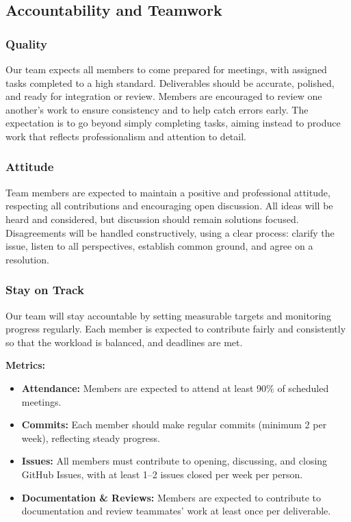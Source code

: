 \documentclass{article}
\begin{document}
\subsection*{Accountability and Teamwork}

\subsubsection*{Quality}

Our team expects all members to come prepared for meetings, with assigned tasks completed to a high standard. Deliverables should be accurate, polished, and ready for integration or review. Members are encouraged to review one another’s work to ensure consistency and to help catch errors early. The expectation is to go beyond simply completing tasks, aiming instead to produce work that reflects professionalism and attention to detail.

\subsubsection*{Attitude}

Team members are expected to maintain a positive and professional attitude, respecting all contributions and encouraging open discussion. All ideas will be heard and considered, but discussion should remain solutions focused. Disagreements will be handled constructively, using a clear process: clarify the issue, listen to all perspectives, establish common ground, and agree on a resolution.

\subsubsection*{Stay on Track}

Our team will stay accountable by setting measurable targets and monitoring progress regularly. Each member is expected to contribute fairly and consistently so that the workload is balanced, and deadlines are met.

\vspace{0.5em}
\noindent\textbf{Metrics:}
\begin{itemize}
    \item \textbf{Attendance:} Members are expected to attend at least 90\% of scheduled meetings.
    \item \textbf{Commits:} Each member should make regular commits (minimum 2 per week), reflecting steady progress.
    \item \textbf{Issues:} All members must contribute to opening, discussing, and closing GitHub Issues, with at least 1--2 issues closed per week per person.
    \item \textbf{Documentation \& Reviews:} Members are expected to contribute to documentation and review teammates’ work at least once per deliverable.
\end{itemize}
\end{document}
